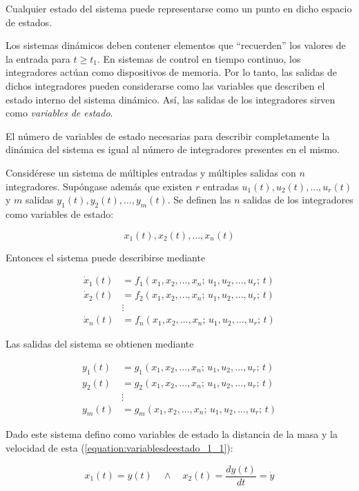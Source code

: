 \documentclass[a4paper]{article}
\begin{document}
Cualquier estado del sistema puede representarse como un punto en dicho 
espacio de estados.

Los sistemas dinámicos deben contener elementos que ``recuerden'' los valores 
de la entrada para $t \geq t_1$. En sistemas de control en tiempo continuo, 
los integradores actúan como dispositivos de memoria. Por lo tanto, las salidas 
de dichos integradores pueden considerarse como las variables que describen el 
estado interno del sistema dinámico. Así, las salidas de los integradores sirven 
como \textit{variables de estado}.

El número de variables de estado necesarias para describir completamente la 
dinámica del sistema es igual al número de integradores presentes en el mismo.

Considérese un sistema de múltiples entradas y múltiples salidas con $n$ 
integradores. Supóngase además que existen $r$ entradas 
$u_1(t), u_2(t), \ldots, u_r(t)$ y $m$ salidas 
$y_1(t), y_2(t), \ldots, y_m(t)$. Se definen las $n$ salidas de los integradores 
como variables de estado:

\[
x_1(t), x_2(t), \ldots, x_n(t)
\]

Entonces el sistema puede describirse mediante

\begin{align}
	\dot{x}_1(t) &= f_1(x_1,x_2,\ldots,x_n;\,u_1,u_2,\ldots,u_r;\,t) \\
	\dot{x}_2(t) &= f_2(x_1,x_2,\ldots,x_n;\,u_1,u_2,\ldots,u_r;\,t) \\
	&\vdots \\
	\dot{x}_n(t) &= f_n(x_1,x_2,\ldots,x_n;\,u_1,u_2,\ldots,u_r;\,t)
\end{align}

Las salidas del sistema se obtienen mediante

\begin{align}
	y_1(t) &= g_1(x_1,x_2,\ldots,x_n;\,u_1,u_2,\ldots,u_r;\,t) \\
	y_2(t) &= g_2(x_1,x_2,\ldots,x_n;\,u_1,u_2,\ldots,u_r;\,t) \\
	&\vdots \\
	y_m(t) &= g_m(x_1,x_2,\ldots,x_n;\,u_1,u_2,\ldots,u_r;\,t)
\end{align}


Dado este sistema defino como variables de estado la distancia de la masa y la velocidad de esta (\ref{equation:variablesdeestado_1_1}):


\begin{equation}\label{equation:variablesdeestado_1_1}
	x_1(t) = y(t) \quad \wedge \quad x_2(t) = \frac{dy(t)}{dt} = \dot{y}
\end{equation}
\end{document}

